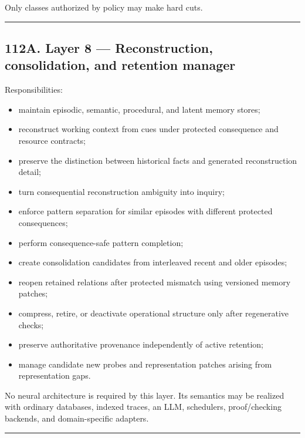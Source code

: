 \documentclass[
]{article}
\providecommand{\tightlist}{%
  \setlength{\itemsep}{0pt}\setlength{\parskip}{0pt}}
\begin{document}
Only classes authorized by policy may make hard cuts.

\begin{center}\rule{0.5\linewidth}{0.5pt}\end{center}



\subsection{112A. Layer 8 --- Reconstruction, consolidation, and retention
manager}\label{layer-8-reconstruction-consolidation-retention-manager}

Responsibilities:

\begin{itemize}
\tightlist
\item maintain episodic, semantic, procedural, and latent memory stores;
\item reconstruct working context from cues under protected consequence and
  resource contracts;
\item preserve the distinction between historical facts and generated
  reconstruction detail;
\item turn consequential reconstruction ambiguity into inquiry;
\item enforce pattern separation for similar episodes with different protected
  consequences;
\item perform consequence-safe pattern completion;
\item create consolidation candidates from interleaved recent and older
  episodes;
\item reopen retained relations after protected mismatch using versioned memory
  patches;
\item compress, retire, or deactivate operational structure only after
  regenerative checks;
\item preserve authoritative provenance independently of active retention;
\item manage candidate new probes and representation patches arising from
  representation gaps.
\end{itemize}

No neural architecture is required by this layer. Its semantics may be realized
with ordinary databases, indexed traces, an LLM, schedulers, proof/checking
backends, and domain-specific adapters.

\begin{center}\rule{0.5\linewidth}{0.5pt}\end{center}
\end{document}
